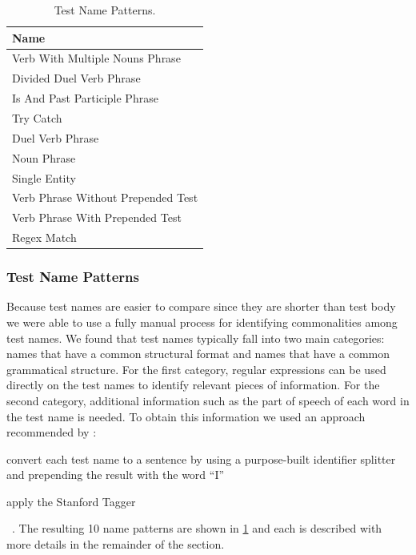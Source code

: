 \documentclass[proposal.tex]{subfiles}
\begin{document}
\begin{description}
\end{description}


\begin{table}[t]
\scriptsize
\centering
\caption{Test Name Patterns.}
 \begin{tabular}{l} 
 \toprule
 \textbf{Name} \\
 \midrule
 Verb With Multiple Nouns Phrase \\
 Divided Duel Verb Phrase \\
 Is And Past Participle Phrase \\
 Try Catch \\
 Duel Verb Phrase \\
 Noun Phrase \\
 Single Entity \\
 Verb Phrase Without Prepended Test \\
 Verb Phrase With Prepended Test \\
 Regex Match \\
 \bottomrule
\end{tabular}
\label{tab:name-patterns}
\end{table}

\subsubsection{Test Name Patterns}
\label{sec:name-patterns}

Because test names are easier to compare since they are shorter than test body we were able to use a fully manual process for identifying commonalities among test names.
%
We found that test names typically fall into two main categories: names that have a common structural format and names that have a common grammatical structure.
%
For the first category, regular expressions can be used directly on the test names to identify relevant pieces of information.
%
For the second category, additional information such as the part of speech of each word in the test name is needed.
%
To obtain this information we used an approach recommended by \citeauthor{olney16tagging}:
\begin{enumerate*}
\item convert each test name to a sentence by using a purpose-built identifier splitter and prepending the result with the word \enquote{I}
\item apply the Stanford Tagger~\cite{StanfordTagger}
\end{enumerate*}~\cite{olney16tagging}.
%
The resulting \num{10} name patterns are shown in \cref{tab:name-patterns} and each is described with more details in the remainder of the section.
\end{document}
